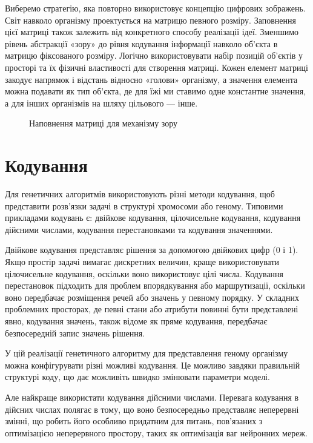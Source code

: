 Виберемо стратегію, яка повторно використовує концепцію цифрових зображень.
Світ навколо організму проектується на матрицю певного розміру.
Заповнення цієї матриці також залежить від конкретного способу реалізації ідеї.
Зменшимо рівень абстракції «зору» до рівня кодування інформації навколо об’єкта в матрицю фіксованого розміру.
Логічно використовувати набір позицій об'єктів у просторі
та їх фізичні властивості для створення матриці.
Кожен елемент матриці закодує напрямок і відстань відносно «голови» організму,
а значення елемента можна подавати як тип об'єкта, де
для їжі ми ставимо одне константне значення, а для інших організмів
на шляху цільового --- інше.

\begin{figure}[ht]
    \centering
    \caption{Наповнення матриці для механізму зору}
    \label{fig:наповнення-матриці-для-механізму-зору}
\end{figure}


\section{Кодування}

Для генетичних алгоритмів використовують різні методи кодування, 
щоб представити розв'язки задачі в структурі хромосоми або геному. 
Типовими прикладами кодувань є: двійкове кодування, 
цілочисельне кодування, кодування дійсними числами, 
кодування перестановками та кодування значеннями.

Двійкове кодування представляє рішення за допомогою двійкових цифр (0 і 1). 
Якщо простір задачі вимагає дискретних величин, 
краще використовувати цілочисельне кодування, оскільки 
воно використовує цілі числа. Кодування перестановок підходить для 
проблем впорядкування або маршрутизації, 
оскільки воно передбачає розміщення речей або значень у певному порядку. 
У складних проблемних просторах, де певні стани або 
атрибути повинні бути представлені явно, кодування значень, 
також відоме як пряме кодування, передбачає безпосередній запис значень рішення.

У цій реалізації генетичного алгоритму для представлення геному організму 
можна конфігурувати різні можливі кодування. 
Це можливо завдяки правильній структурі коду, 
що дає можливіть швидко змінювати параметри моделі.

Але найкраще використати кодування дійсними числами. 
Перевага кодування в дійсних числах полягає в тому, 
що воно безпосередньо представляє неперервні змінні, що 
робить його особливо придатним для питань, 
пов'язаних з оптимізацією неперервного простору, 
таких як оптимізація ваг нейронних мереж.


